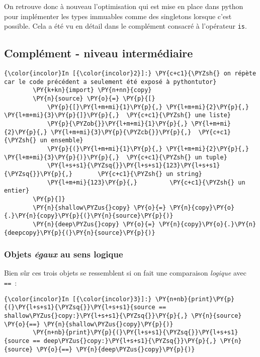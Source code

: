 On retrouve donc à nouveau l'optimisation qui est mise en place dans
python pour implémenter les types immuables comme des singletons lorsque
c'est possible. Cela a été vu en détail dans le complément consacré à
l'opérateur \texttt{is}.

    \hypertarget{compluxe9ment---niveau-intermuxe9diaire}{%
\subsection{Complément - niveau
intermédiaire}\label{compluxe9ment---niveau-intermuxe9diaire}}

    \begin{Verbatim}[commandchars=\\\{\}]
{\color{incolor}In [{\color{incolor}2}]:} \PY{c+c1}{\PYZsh{} on répète car le code précédent a seulement été exposé à pythontutor}
        \PY{k+kn}{import} \PY{n+nn}{copy}
        \PY{n}{source} \PY{o}{=} \PY{p}{[}
            \PY{p}{[}\PY{l+m+mi}{1}\PY{p}{,} \PY{l+m+mi}{2}\PY{p}{,} \PY{l+m+mi}{3}\PY{p}{]}\PY{p}{,}  \PY{c+c1}{\PYZsh{} une liste}
            \PY{p}{\PYZob{}}\PY{l+m+mi}{1}\PY{p}{,} \PY{l+m+mi}{2}\PY{p}{,} \PY{l+m+mi}{3}\PY{p}{\PYZcb{}}\PY{p}{,}  \PY{c+c1}{\PYZsh{} un ensemble}
            \PY{p}{(}\PY{l+m+mi}{1}\PY{p}{,} \PY{l+m+mi}{2}\PY{p}{,} \PY{l+m+mi}{3}\PY{p}{)}\PY{p}{,}  \PY{c+c1}{\PYZsh{} un tuple}
            \PY{l+s+s1}{\PYZsq{}}\PY{l+s+s1}{123}\PY{l+s+s1}{\PYZsq{}}\PY{p}{,}       \PY{c+c1}{\PYZsh{} un string}
            \PY{l+m+mi}{123}\PY{p}{,}         \PY{c+c1}{\PYZsh{} un entier}
        \PY{p}{]}
        \PY{n}{shallow\PYZus{}copy} \PY{o}{=} \PY{n}{copy}\PY{o}{.}\PY{n}{copy}\PY{p}{(}\PY{n}{source}\PY{p}{)}
        \PY{n}{deep\PYZus{}copy} \PY{o}{=} \PY{n}{copy}\PY{o}{.}\PY{n}{deepcopy}\PY{p}{(}\PY{n}{source}\PY{p}{)}
\end{Verbatim}


    \hypertarget{objets-uxe9gaux-au-sens-logique}{%
\subsubsection{\texorpdfstring{Objets \emph{égaux} au sens
logique}{Objets égaux au sens logique}}\label{objets-uxe9gaux-au-sens-logique}}

    Bien sûr ces trois objets se ressemblent si on fait une comparaison
\emph{logique} avec \texttt{==}~:

    \begin{Verbatim}[commandchars=\\\{\}]
{\color{incolor}In [{\color{incolor}3}]:} \PY{n+nb}{print}\PY{p}{(}\PY{l+s+s1}{\PYZsq{}}\PY{l+s+s1}{source == shallow\PYZus{}copy:}\PY{l+s+s1}{\PYZsq{}}\PY{p}{,} \PY{n}{source} \PY{o}{==} \PY{n}{shallow\PYZus{}copy}\PY{p}{)}
        \PY{n+nb}{print}\PY{p}{(}\PY{l+s+s1}{\PYZsq{}}\PY{l+s+s1}{source == deep\PYZus{}copy:}\PY{l+s+s1}{\PYZsq{}}\PY{p}{,} \PY{n}{source} \PY{o}{==} \PY{n}{deep\PYZus{}copy}\PY{p}{)}
\end{Verbatim}


